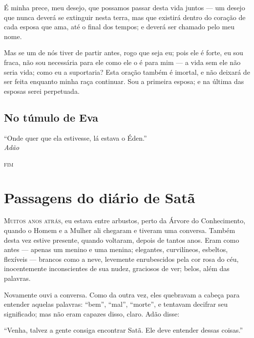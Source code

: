 É minha prece, meu desejo, que possamos passar desta vida juntos --- um desejo
que nunca deverá se extinguir nesta terra, mas que existirá dentro do
coração de cada esposa que ama, até o final dos tempos; e deverá ser chamado pelo
meu nome.

Mas se um de nós tiver de partir antes, rogo que seja eu; pois ele é forte, eu
sou fraca, não sou necessária para ele como ele o é para mim --- a
vida sem ele não seria vida; como eu a suportaria? Esta oração também é
imortal, e não deixará de ser feita enquanto minha raça continuar. Sou a
primeira esposa; e na última das esposas serei perpetuada.

\begin{center}
\end{center}

\section{No túmulo de Eva}
\medskip

``Onde quer que ela estivesse, lá estava o Éden.''
\\

\hfill\textit{Adão}  

\begin{center}
\textsc{fim}
\end{center}




\chapter[Passagens do diário de Satã]{Passagens do diário de Satã}

\textsc{Muitos anos atrás,} eu estava entre arbustos, perto da Árvore do
Conhecimento, quando o Homem e a Mulher ali chegaram e tiveram uma
conversa. Também desta vez estive presente, quando voltaram,
depois de tantos anos. Eram como antes --- apenas um menino e uma menina;
elegantes, curvilíneos, esbeltos, flexíveis --- brancos
como a neve, levemente enrubescidos pela cor rosa do céu, inocentemente
inconscientes de sua nudez, graciosos de ver; belos,
além das palavras.

Novamente ouvi a conversa. Como da outra vez, eles quebravam a cabeça
para entender aquelas palavras: ``bem'', ``mal'', ``morte'', e
tentavam decifrar seu significado; mas não eram capazes disso,
claro. Adão disse:

“Venha, talvez a gente consiga encontrar Satã. Ele deve entender dessas coisas.”

